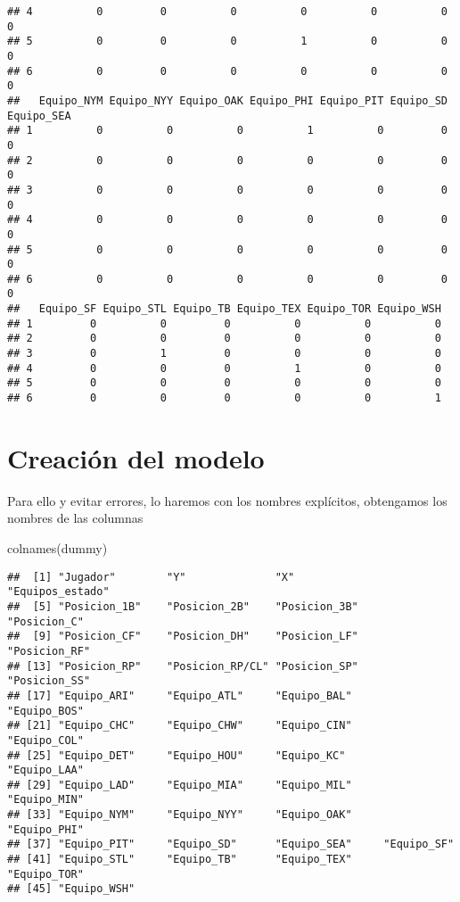\documentclass[
]{article}
\newenvironment{Shaded}{\begin{snugshade}}{\end{snugshade}}
\newcommand{\FunctionTok}[1]{\textcolor[rgb]{0.00,0.00,0.00}{#1}}
\newcommand{\NormalTok}[1]{#1}
\begin{document}
\begin{verbatim}
## 4          0         0          0          0          0          0          0
## 5          0         0          0          1          0          0          0
## 6          0         0          0          0          0          0          0
##   Equipo_NYM Equipo_NYY Equipo_OAK Equipo_PHI Equipo_PIT Equipo_SD Equipo_SEA
## 1          0          0          0          1          0         0          0
## 2          0          0          0          0          0         0          0
## 3          0          0          0          0          0         0          0
## 4          0          0          0          0          0         0          0
## 5          0          0          0          0          0         0          0
## 6          0          0          0          0          0         0          0
##   Equipo_SF Equipo_STL Equipo_TB Equipo_TEX Equipo_TOR Equipo_WSH
## 1         0          0         0          0          0          0
## 2         0          0         0          0          0          0
## 3         0          1         0          0          0          0
## 4         0          0         0          1          0          0
## 5         0          0         0          0          0          0
## 6         0          0         0          0          0          1
\end{verbatim}

\section{Creación del modelo}

Para ello y evitar errores, lo haremos con los nombres explícitos,
obtengamos los nombres de las columnas

\begin{Shaded}
\begin{Highlighting}[]
\FunctionTok{colnames}\NormalTok{(dummy)}
\end{Highlighting}
\end{Shaded}

\begin{verbatim}
##  [1] "Jugador"        "Y"              "X"              "Equipos_estado"
##  [5] "Posicion_1B"    "Posicion_2B"    "Posicion_3B"    "Posicion_C"    
##  [9] "Posicion_CF"    "Posicion_DH"    "Posicion_LF"    "Posicion_RF"   
## [13] "Posicion_RP"    "Posicion_RP/CL" "Posicion_SP"    "Posicion_SS"   
## [17] "Equipo_ARI"     "Equipo_ATL"     "Equipo_BAL"     "Equipo_BOS"    
## [21] "Equipo_CHC"     "Equipo_CHW"     "Equipo_CIN"     "Equipo_COL"    
## [25] "Equipo_DET"     "Equipo_HOU"     "Equipo_KC"      "Equipo_LAA"    
## [29] "Equipo_LAD"     "Equipo_MIA"     "Equipo_MIL"     "Equipo_MIN"    
## [33] "Equipo_NYM"     "Equipo_NYY"     "Equipo_OAK"     "Equipo_PHI"    
## [37] "Equipo_PIT"     "Equipo_SD"      "Equipo_SEA"     "Equipo_SF"     
## [41] "Equipo_STL"     "Equipo_TB"      "Equipo_TEX"     "Equipo_TOR"    
## [45] "Equipo_WSH"
\end{verbatim}
\end{document}
